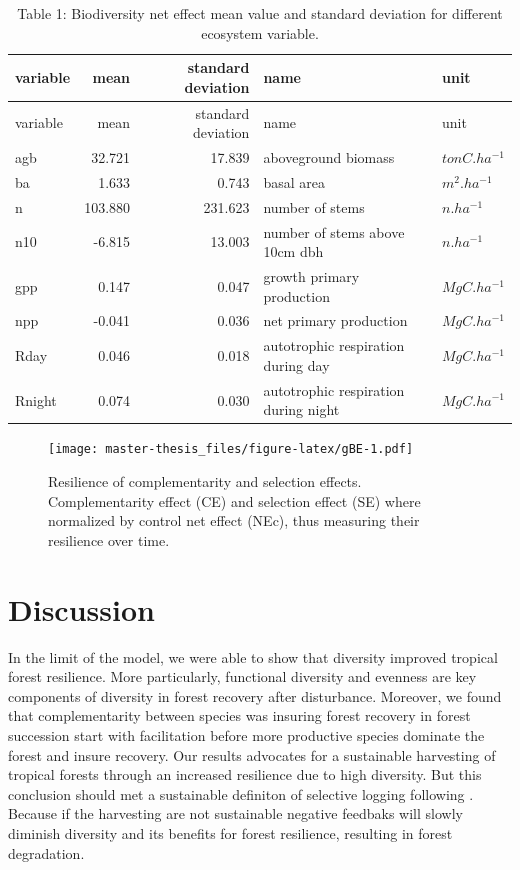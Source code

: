 \documentclass[12pt,]{article}
\let\oldsection\section
\renewcommand\section{\newpage\oldsection}
\theoremstyle{definition}
\theoremstyle{definition}
\theoremstyle{remark}
\begin{document}
\begin{longtable}[]{@{}lrrll@{}}
\caption{\label{tab:tNE}Table 1: Biodiversity net effect mean value and
standard deviation for different ecosystem variable.}\tabularnewline
\toprule
variable & mean & standard deviation & name & unit\tabularnewline
\midrule
\endfirsthead
\toprule
variable & mean & standard deviation & name & unit\tabularnewline
\midrule
\endhead
agb & 32.721 & 17.839 & aboveground biomass &
\(tonC.ha^{-1}\)\tabularnewline
ba & 1.633 & 0.743 & basal area & \(m^2.ha^{-1}\)\tabularnewline
n & 103.880 & 231.623 & number of stems & \(n.ha^{-1}\)\tabularnewline
n10 & -6.815 & 13.003 & number of stems above 10cm dbh &
\(n.ha^{-1}\)\tabularnewline
gpp & 0.147 & 0.047 & growth primary production &
\(MgC.ha^{-1}\)\tabularnewline
npp & -0.041 & 0.036 & net primary production &
\(MgC.ha^{-1}\)\tabularnewline
Rday & 0.046 & 0.018 & autotrophic respiration during day &
\(MgC.ha^{-1}\)\tabularnewline
Rnight & 0.074 & 0.030 & autotrophic respiration during night &
\(MgC.ha^{-1}\)\tabularnewline
\bottomrule
\end{longtable}

\begin{figure}[htbp]
\centering
\texttt{[image: master-thesis\_files/figure-latex/gBE-1.pdf]}
\caption{\label{fig:gBE}Resilience of complementarity and selection effects.
Complementarity effect (CE) and selection effect (SE) where normalized
by control net effect (NEc), thus measuring their resilience over time.}
\end{figure}

\section{Discussion}\label{discussion}

In the limit of the model, we were able to show that diversity improved
tropical forest resilience. More particularly, functional diversity and
evenness are key components of diversity in forest recovery after
disturbance. Moreover, we found that complementarity between species was
insuring forest recovery in forest succession start with facilitation
before more productive species dominate the forest and insure recovery.
Our results advocates for a sustainable harvesting of tropical forests
through an increased resilience due to high diversity. But this
conclusion should met a sustainable definiton of selective logging
following \citet{Zimmerman2012}. Because if the harvesting are not
sustainable negative feedbaks will slowly diminish diversity and its
benefits for forest resilience, resulting in forest degradation.
\end{document}
